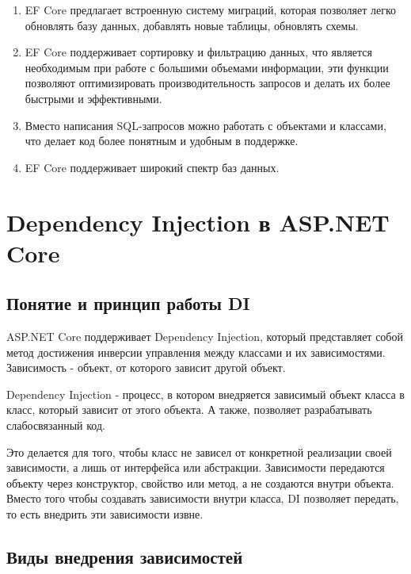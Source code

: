 \documentclass[a4paper,12pt]{report}
\begin{document}
\begin{enumerate}
    \item
        \acs{EF} Core предлагает встроенную систему миграций, которая позволяет легко 
        обновлять базу данных, добавлять новые таблицы, обновлять схемы.
    \item
        \acs{EF} Core поддерживает сортировку и фильтрацию данных, 
        что является необходимым при работе с большими объемами информации, эти функции позволяют оптимизировать производительность 
        запросов и делать их более быстрыми и эффективными.
    \item
        Вместо написания \acs{SQL}-запросов можно работать с объектами и классами, 
        что делает код более понятным и удобным в поддержке.
    \item
        \acs{EF} Core поддерживает широкий спектр баз данных.
\end{enumerate}

\section{Dependency Injection в ASP.NET Core}

\subsection{Понятие и принцип работы \acs{DI}}

ASP.NET Core поддерживает Dependency Injection, который представляет собой метод достижения инверсии управления 
между классами и их зависимостями. Зависимость - объект, от которого зависит другой объект.

Dependency Injection - процесс, в котором внедряется зависимый объект класса в класс, который зависит от этого объекта.
А также, позволяет разрабатывать слабосвязанный код. 

Это делается для того, чтобы класс не зависел от конкретной реализации своей зависимости, 
а лишь от интерфейса или абстракции. Зависимости передаются объекту через конструктор, свойство или метод, а не создаются внутри объекта. 
Вместо того чтобы создавать зависимости внутри класса, \acs{DI} позволяет передать, то есть внедрить эти зависимости извне.\cite{dependency_injection}

\subsection{Виды внедрения зависимостей}
\end{document}

